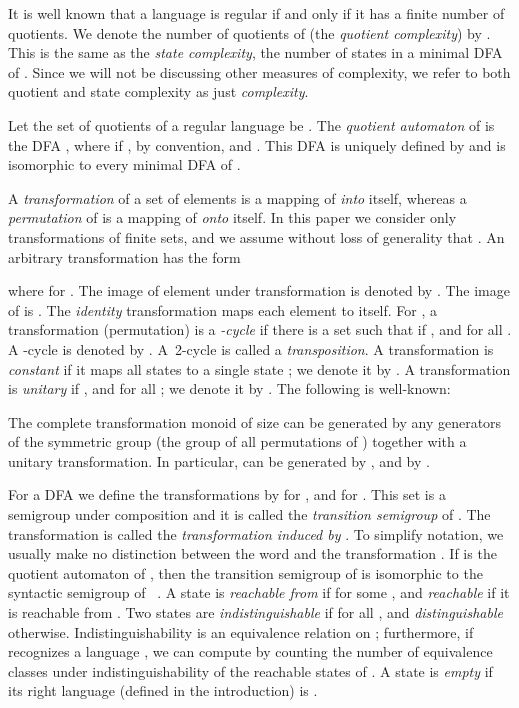 \documentclass{llncs}
\begin{document}
It is well known that a language  is regular if and only if it has a finite number of quotients. We denote the number of quotients of   (the \emph{quotient complexity}) by . This is the same as the \emph{state complexity}, the number of states in a minimal DFA of . Since we will not be discussing other measures of complexity, we refer to both quotient and state complexity as just \emph{complexity}.

Let the set of quotients of a regular language  be .
The \emph{quotient automaton} of  is the DFA , where 
 if ,  by convention, and . This DFA is uniquely defined by  and is isomorphic to every minimal DFA of . 


A \emph{transformation} of a set  of  elements is a mapping of  \emph{into} itself, whereas a \emph{permutation}
of  is a mapping of  \emph{onto} itself.
In this paper we consider only transformations of finite sets, and we assume
without loss of generality  that .
An arbitrary transformation has the form

where  for .
The image of element  under transformation  is denoted by .
The image of  is .
The \emph{identity} transformation  maps each element to itself.
For , a transformation (permutation)  is a \emph{-cycle} if there is a set  such that if , and  for all .
A -cycle is denoted by .
A~2-cycle  is called a \emph{transposition}.
A transformation is \emph{constant} if it maps all states to a single state ; we denote it by .
A  transformation  is \emph{unitary}  if ,  and  for all ; we denote it by . 
The following is well-known:

\begin{proposition}
\label{prop:piccard}
The complete transformation monoid  of size  can be generated by any generators of the symmetric group  (the group of all permutations of ) together with a unitary transformation. In particular,  can be generated by , and by .
\end{proposition}

For a DFA  we define the transformations  by  for , and  for . This set is a semigroup under composition and it is called the \emph{transition semigroup} of . 
The transformation  is called the \emph{transformation induced by }. To simplify notation, we usually make no distinction between the word  and the transformation . 
If  is the quotient automaton of , then the transition semigroup of  is isomorphic to the syntactic semigroup of ~\cite{Pin97}.
A state  is \emph{reachable from } if  for some , and \emph{reachable} if it is reachable from .
Two states  are \emph{indistinguishable} if  for all , and \emph{distinguishable} otherwise.
Indistinguishability is an equivalence relation on ; furthermore, if  recognizes a language , we can compute  by counting the number of equivalence classes under  indistinguishability of the reachable states of .
A state is \emph{empty} if its right language (defined in the introduction) is .
\end{document}
